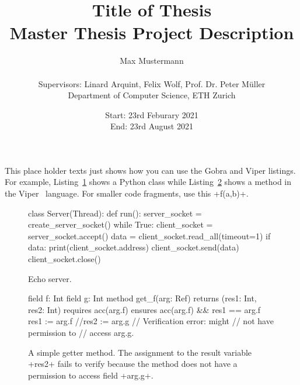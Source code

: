 \documentclass{article}
\title{Title of Thesis \\
{\large Master Thesis Project Description}}
\author{Max Mustermann \\ \\ Supervisors: Linard Arquint, Felix Wolf, Prof. Dr. Peter Müller \\
Department of Computer Science, ETH Zurich}
\date{Start: 23rd Feburary 2021 \\
      End: 23rd August 2021}
\begin{document}
\maketitle

\thispagestyle{plain}
\pagestyle{plain}

This place holder texts just shows how you can use the Gobra and Viper listings.
For example, Listing~\ref{lst:echoServer}
shows a Python class while Listing~\ref{lst:silver_fields} shows a
method in the Viper~\cite{viper} language. For smaller code fragments,
use this \gl+f(a,b)+. 

\begin{figure}
  \begin{gobra}
    class Server(Thread):
      def run():
        server_socket = create_server_socket()
        while True:
          client_socket = server_socket.accept()
          data = client_socket.read_all(timeout=1)
          if data:
            print(client_socket.address)
            client_socket.send(data)
          client_socket.close()
  \end{gobra}
  \caption{Echo server.}
  \label{lst:echoServer}
\end{figure}

\begin{figure}
    \begin{myViper}
      field f: Int
      field g: Int
      method get_f(arg: Ref) returns (res1: Int,
                                      res2: Int)
        requires acc(arg.f)
        ensures acc(arg.f) && res1 == arg.f
      {
        res1 := arg.f
      //res2 := arg.g   // Verification error: might
                        // not have permission to
                        // access arg.g.
      }
    \end{myViper}
    \caption{A simple getter method. The assignment to the result
        variable \vl+res2+ fails to verify because the method does
        not have a permission to access field \vl+arg.g+.}
    \label{lst:silver_fields}
\end{figure}



\end{document}
